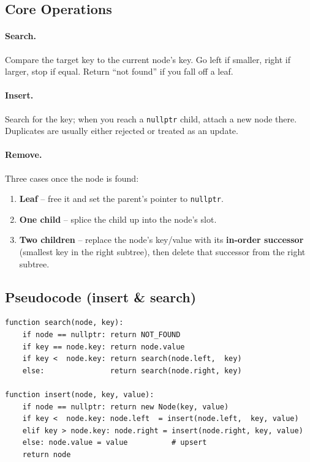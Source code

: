 \documentclass[11pt]{article}
\begin{document}
\subsection*{Core Operations}

\paragraph{Search.}
Compare the target key to the current node's key. Go left if smaller,
right if larger, stop if equal. Return ``not found'' if you fall off a
leaf.

\paragraph{Insert.}
Search for the key; when you reach a \texttt{nullptr} child, attach a
new node there. Duplicates are usually either rejected or treated as
an update.

\paragraph{Remove.}
Three cases once the node is found:
\begin{enumerate}[leftmargin=*]
    \item \textbf{Leaf} -- free it and set the parent's pointer to
          \texttt{nullptr}.
    \item \textbf{One child} -- splice the child up into the node's
          slot.
    \item \textbf{Two children} -- replace the node's key/value with
          its \textbf{in-order successor} (smallest key in the right
          subtree), then delete that successor from the right subtree.
\end{enumerate}

\subsection*{Pseudocode (insert \& search)}
\begin{lstlisting}[basicstyle=\ttfamily\small,frame=single]
function search(node, key):
    if node == nullptr: return NOT_FOUND
    if key == node.key: return node.value
    if key <  node.key: return search(node.left,  key)
    else:               return search(node.right, key)

function insert(node, key, value):
    if node == nullptr: return new Node(key, value)
    if key <  node.key: node.left  = insert(node.left,  key, value)
    elif key > node.key: node.right = insert(node.right, key, value)
    else: node.value = value          # upsert
    return node
\end{lstlisting}
\end{document}
